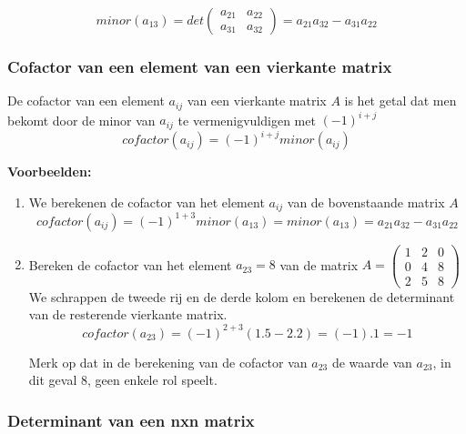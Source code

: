 \[ minor(a_{13})=det \left( \begin{matrix} a_{21} & a_{22} \\ a_{31} & a_{32} \end{matrix} \right) = a_{21}a_{32}-a_{31}a_{22} \]

\subsubsection{Cofactor van een element van een vierkante matrix}

De cofactor van een element $a_{ij}$ van een vierkante matrix $A$ is het getal dat men bekomt door de minor van $a_{ij}$ te vermenigvuldigen met $(-1)^{i+j}$\\

\[ cofactor(a_{ij})=(-1)^{i+j} minor(a_{ij}) \]

{\bf Voorbeelden:}\\

\begin{enumerate}
	\item 
We berekenen de cofactor van het element $a_{ij}$ van de bovenstaande matrix $A$\\

\[ cofactor(a_{ij})=(-1)^{1+3} minor(a_{13})=minor(a_{13})=a_{21}a_{32}-a_{31}a_{22} \] 

	\item
Bereken de cofactor van het element $a_{23}=8$ van de matrix $A=\left( \begin{matrix} 1 & 2 & 0 \\ 0 & 4 & 8 \\ 2 & 5 & 8 \end{matrix} \right)$\\

We schrappen de tweede rij en de derde kolom en berekenen de determinant van de resterende vierkante matrix.\\

\[ cofactor(a_{23})=(-1)^{2+3} (1.5-2.2) = (-1).1 =-1 \]

Merk op dat in de berekening van de cofactor van $a_{23}$ de waarde van $a_{23}$, in dit geval $8$, geen enkele rol speelt.

\end{enumerate}

\subsubsection{Determinant van een nxn matrix}

